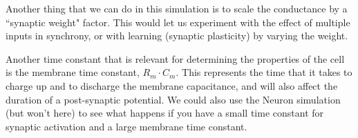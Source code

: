 \documentclass[12pt]{article}
\begin{document}
Another thing that we can do in this simulation is to scale the conductance by a ``synaptic weight" factor. This would let us experiment with the effect of multiple inputs in synchrony, or with learning (synaptic plasticity) by varying the weight.

Another time constant that is relevant for determining the properties of the cell is the membrane time constant, $R_m\cdot C_m$. This represents the time that it takes to charge up and to discharge the membrane capacitance, and will also affect the duration of a post-synaptic potential. We could also use the Neuron simulation (but won't here) to see what happens if you have a small time constant for synaptic activation and a large membrane time constant.
\end{document}

